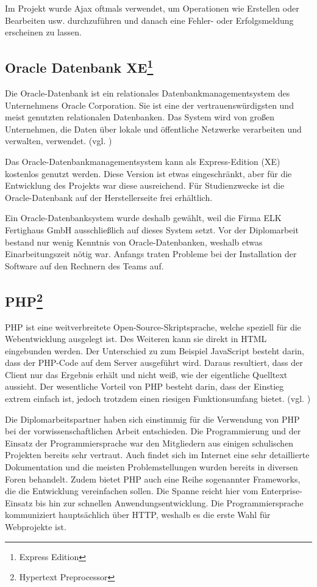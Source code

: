 Im Projekt wurde Ajax oftmals verwendet, um Operationen wie Erstellen oder Bearbeiten usw. durchzuführen und danach eine Fehler- oder Erfolgsmeldung erscheinen zu lassen.

\subsection[Oracle-Datenbank XE]{Oracle Datenbank XE\footnote{Express Edition}}
Die Oracle-Datenbank ist ein relationales Datenbankmanagementsystem des Unternehmens Oracle Corporation. Sie ist eine der vertrauenswürdigsten und meist genutzten relationalen Datenbanken. Das System wird von großen Unternehmen, die Daten über lokale und öffentliche Netzwerke verarbeiten und verwalten, verwendet. (vgl. \cite{oracle})

Das Oracle-Datenbankmanagementsystem kann als Express-Edition (XE) kostenlos genutzt werden. Diese Version ist etwas eingeschränkt, aber für die Entwicklung des Projekts war diese ausreichend. Für Studienzwecke ist die Oracle-Datenbank auf der Herstellerseite frei erhältlich.

Ein Oracle-Datenbanksystem wurde deshalb gewählt, weil die Firma ELK Fertighaus GmbH ausschließlich auf dieses System setzt. Vor der Diplomarbeit bestand nur wenig Kenntnis von Oracle-Datenbanken, weshalb etwas Einarbeitungszeit nötig war. Anfangs traten Probleme bei der Installation der Software auf den Rechnern des Teams auf. 

\subsection[PHP]{PHP\footnote{Hypertext Preprocessor}}
PHP ist eine weitverbreitete Open-Source-Skriptsprache, welche speziell für die Webentwicklung ausgelegt ist. Des Weiteren kann sie direkt in HTML eingebunden werden. Der Unterschied zu zum Beispiel JavaScript besteht darin, dass der PHP-Code auf dem Server ausgeführt wird. Daraus resultiert, dass der Client nur das Ergebnis erhält und nicht weiß, wie der eigentliche Quelltext aussieht. Der wesentliche Vorteil von PHP besteht darin, dass der Einstieg extrem einfach ist, jedoch trotzdem einen riesigen Funktionsumfang bietet. (vgl. \cite{php})

Die Diplomarbeitspartner haben sich einstimmig für die Verwendung von PHP bei der vorwissenschaftlichen Arbeit entschieden. Die Programmierung und der Einsatz der Programmiersprache war den Mitgliedern aus einigen schulischen Projekten bereits sehr vertraut. Auch findet sich im Internet eine sehr detaillierte Dokumentation und die meisten Problemstellungen wurden bereits in diversen Foren behandelt. Zudem bietet PHP auch eine Reihe sogenannter Frameworks, die die Entwicklung vereinfachen sollen. Die Spanne reicht hier vom Enterprise-Einsatz bis hin zur schnellen Anwendungsentwicklung. Die Programmiersprache kommuniziert hauptsächlich über HTTP, weshalb es die erste Wahl für Webprojekte ist.

